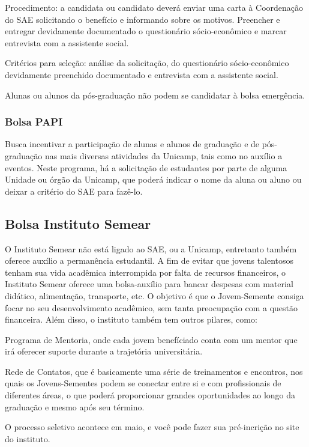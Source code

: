 Procedimento: a candidata ou candidato deverá enviar uma carta à Coordenação do
SAE solicitando o benefício e informando sobre os motivos. Preencher e entregar
devidamente documentado o questionário sócio-econômico e marcar entrevista com
a assistente social.

Critérios para seleção: análise da solicitação, do questionário sócio-econômico
devidamente preenchido documentado e entrevista com a assistente social.

Alunas ou alunos da pós-graduação não podem se candidatar à bolsa emergência.

\subsubsection{Bolsa PAPI}

Busca incentivar a participação de alunas e alunos de graduação e de
pós-graduação nas mais diversas atividades da Unicamp, tais como no auxílio a
eventos. Neste programa, há a solicitação de estudantes por parte de alguma
Unidade ou órgão da Unicamp, que poderá indicar o nome da aluna ou aluno ou
deixar a critério do SAE para fazê-lo.

\subsection{Bolsa Instituto Semear}

O Instituto Semear não está ligado ao SAE, ou a Unicamp, entretanto também oferece auxílio a permanência estudantil.
A fim de evitar que jovens talentosos tenham sua vida acadêmica interrompida por falta de recursos financeiros, o Instituto Semear oferece uma bolsa-auxílio para bancar despesas com material didático, alimentação, transporte, etc. O objetivo é que o Jovem-Semente consiga focar no seu desenvolvimento acadêmico, sem tanta preocupação com a questão financeira.
Além disso, o instituto também tem outros pilares, como:
\begin{compactitemize}
\item Programa de Mentoria, onde cada jovem benefíciado conta com um mentor que irá oferecer suporte durante a trajetória universitária.
\item Rede de Contatos, que é basicamente uma série de treinamentos e encontros, nos quais os Jovens-Sementes podem se conectar entre si e com profissionais de diferentes áreas, o que poderá proporcionar grandes oportunidades ao longo da graduação e mesmo após seu término.
\end{compactitemize}
O processo seletivo acontece em maio, e você pode fazer sua pré-incrição no site do instituto.

